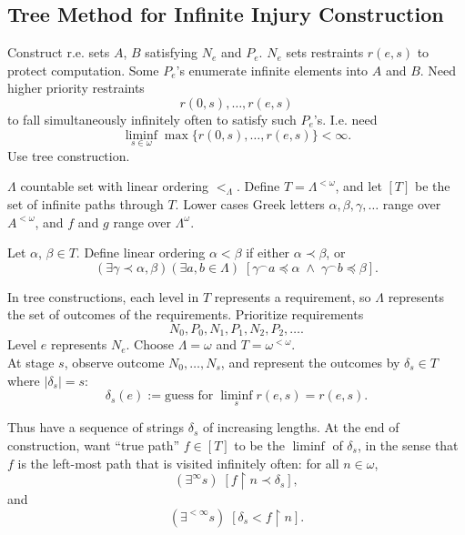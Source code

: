 \subsection{Tree Method for Infinite Injury Construction}
  \label{section:infinite-injury}
  Construct r.e. sets $A$, $B$ satisfying $N_e$ and $P_e$.  $N_e$ sets
  restraints $r(e,s)$ to protect computation. Some $P_e$'s enumerate
  infinite elements into $A$ and $B$. Need higher priority restraints
  \[r(0,s),\ldots,r(e,s)\]
  to fall simultaneously infinitely often to satisfy such $P_e$'s. I.e.
  need
  \begin{equation}
    \liminf_{s\in\omega} \max\{r(0,s),\ldots,r(e,s)\} <\infty.
    \label{eqn:liminf}
  \end{equation}
  Use tree construction.

  \begin{definition}
    $\Lambda$ countable set with linear ordering $<_\Lambda$. Define
    $T=\Lambda^{<\omega}$, and let $[T]$ be the set of infinite paths
    through $T$. Lower cases Greek letters $\alpha,\beta,\gamma,\ldots$
    range over $A^{<\omega}$, and $f$ and $g$ range over $\Lambda^\omega$.
  \end{definition}

  \begin{definition}
    Let $\alpha$, $\beta\in T$. Define linear ordering $\alpha<\beta$
    if either $\alpha \prec \beta$, or
    \[(\exists \gamma \prec \alpha, \beta) (\exists a,b \in \Lambda)\;
    [\gamma^\frown a \preceq\alpha\; \wedge\; \gamma^\frown b
    \preceq\beta].\]
  \end{definition}

  In tree constructions, each level in $T$ represents a requirement, so
  $\Lambda$ represents the set of outcomes of the requirements. Prioritize
  requirements
  \[N_0, P_0, N_1, P_1, N_2, P_2, \ldots.\]
  Level $e$ represents $N_e$. Choose $\Lambda=\omega$ and
  $T=\omega^{<\omega}$. \\

  At stage $s$, observe outcome $N_0,\ldots,N_s$, and represent the
  outcomes by $\delta_s\in T$ where $|\delta_s|=s$:
  \[\delta_s(e) :=\text{guess for}\; \liminf_s r(e,s) =r(e,s).\]
  
  Thus have a sequence of strings $\delta_s$ of increasing lengths. At the
  end of construction, want ``true path'' $f\in[T]$ to be the $\liminf$ of
  $\delta_s$, in the sense that $f$ is the left-most path that is visited
  infinitely often: for all $n\in\omega$,
  \[(\exists^\infty s)\; [f\restriction n \prec
  \delta_s],\]
  and
  \[(\exists^{<\infty} s)\; [\delta_s < f\restriction n].\]

